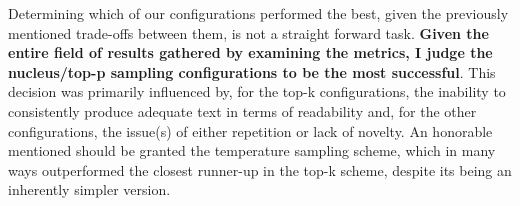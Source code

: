 Determining which of our configurations performed the best, given the previously mentioned trade-offs between them, is not a straight forward task. \textbf{Given the entire field of results gathered by examining the metrics, I judge the nucleus/top-p sampling configurations to be the most successful}. This decision was primarily influenced by, for the top-k configurations, the inability to consistently produce adequate text in terms of readability and, for the other configurations, the issue(s) of either repetition or lack of novelty. An honorable mentioned should be granted the temperature sampling scheme, which in many ways outperformed the closest runner-up in the top-k scheme, despite its being an inherently simpler version.